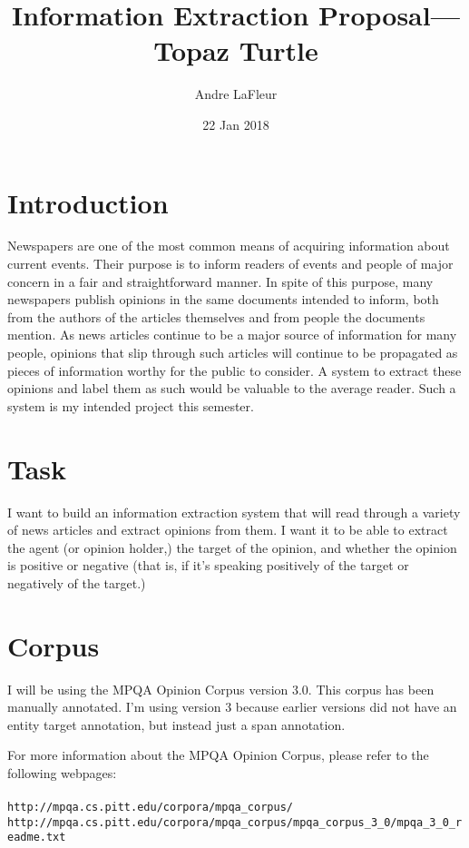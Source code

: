 \documentclass{article}
\title{Information Extraction Proposal---Topaz Turtle}
\author{Andre LaFleur}
\date{22 Jan 2018}
\begin{document}
	\maketitle

    \section{Introduction}

    Newspapers are one of the most common means of acquiring information about current events. Their purpose is to inform readers of events and people of major concern in a fair and straightforward manner. In spite of this purpose, many newspapers publish opinions in the same documents intended to inform, both from the authors of the articles themselves and from people the documents mention. As news articles continue to be a major source of information for many people, opinions that slip through such articles will continue to be propagated as pieces of information worthy for the public to consider. A system to extract these opinions and label them as such would be valuable to the average reader. Such a system is my intended project this semester.

    \section{Task}

    I want to build an information extraction system that will read through a variety of news articles and extract opinions from them. I want it to be able to extract the agent (or opinion holder,) the target of the opinion, and whether the opinion is positive or negative (that is, if it's speaking positively of the target or negatively of the target.)

    \section{Corpus}

    I will be using the MPQA Opinion Corpus version 3.0. This corpus has been manually annotated. I'm using version 3 because earlier versions did not have an entity target annotation, but instead just a span annotation.

    For more information about the MPQA Opinion Corpus, please refer to the following webpages:\\ \\
    \verb|http://mpqa.cs.pitt.edu/corpora/mpqa_corpus/|\\
    \verb|http://mpqa.cs.pitt.edu/corpora/mpqa_corpus/mpqa_corpus_3_0/mpqa_3_0_readme.txt|
\end{document}
